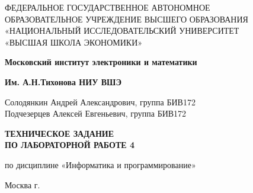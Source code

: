 \begin{titlepage}
	\begin{center}
		ФЕДЕРАЛЬНОЕ  ГОСУДАРСТВЕННОЕ АВТОНОМНОЕ \\
		ОБРАЗОВАТЕЛЬНОЕ УЧРЕЖДЕНИЕ ВЫСШЕГО ОБРАЗОВАНИЯ\\
		«НАЦИОНАЛЬНЫЙ ИССЛЕДОВАТЕЛЬСКИЙ УНИВЕРСИТЕТ\\
		«ВЫСШАЯ ШКОЛА ЭКОНОМИКИ»
	\end{center}
	
	\begin{center}
		\textbf{Московский институт электроники и математики}
		
		\textbf{Им. А.Н.Тихонова НИУ ВШЭ}
	\end{center}
	\vspace{1ex}	
	\begin{center}
		Солодянкин Андрей Александрович, группа БИВ172\\
		Подчезерцев Алексей Евгеньевич, группа БИВ172
	\end{center}	
	\vspace{1ex}
	\begin{center}
		\textbf{ТЕХНИЧЕСКОЕ ЗАДАНИЕ\\
		ПО ЛАБОРАТОРНОЙ РАБОТЕ 4
	}
	\end{center}	
	\vspace{2ex}
	\begin{center}
		по дисциплине «Информатика и программирование»\\
	\end{center}
	\vspace{2ex}
	\begin{center}
	\end{center}
	\vspace{2ex}
	\vfill
	\begin{center}
		Москва \the\year г.
	\end{center}
\end{titlepage}